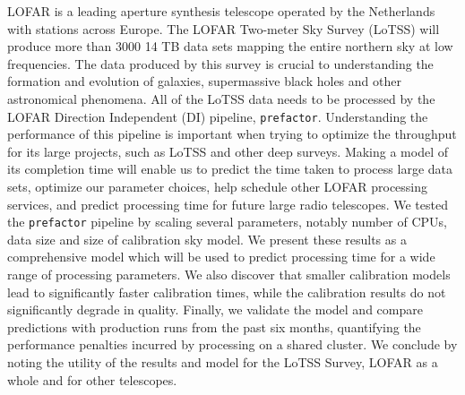LOFAR is a leading aperture synthesis telescope operated by the Netherlands with stations across Europe. The LOFAR Two-meter Sky Survey (LoTSS) will produce more than 3000 14 TB data sets mapping the entire northern sky at low frequencies. The data produced by this survey is crucial to understanding the formation and evolution of galaxies, supermassive black holes and other astronomical phenomena. All of the LoTSS data needs to be processed by the LOFAR Direction Independent (DI) pipeline, \texttt{prefactor}. Understanding the performance of this pipeline is important when trying to optimize the throughput for its large projects, such as LoTSS and other deep surveys. Making a model of its completion time will enable us to predict the time taken to process large data sets, optimize our parameter choices, help schedule other LOFAR processing services, and predict processing time for future large radio telescopes. We tested the \texttt{prefactor} pipeline by scaling several parameters, notably number of CPUs, data size and size of calibration sky model. We present these results as a comprehensive model which will be used to predict processing time for a wide range of processing parameters. We also discover that smaller calibration models lead to significantly faster calibration times, while the calibration results do not significantly degrade in quality. Finally, we validate the model and compare predictions with production runs from the past six months, quantifying the performance penalties incurred by processing on a shared cluster. We conclude by noting the utility of the results and model for the LoTSS Survey, LOFAR as a whole and for other telescopes. 
